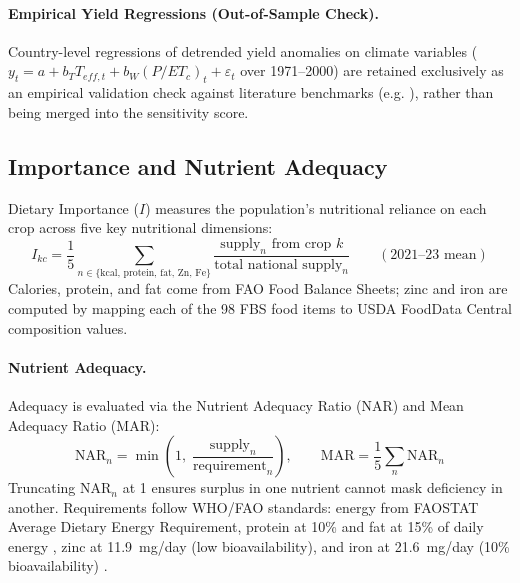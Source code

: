 \documentclass[11pt,a4paper]{article}
\let\parencite\citep
\newcommand{\TT}{\mathrm{T}}   %
\begin{document}
\begin{table}[H]\centering\small

\caption{Literature parameters used for Exposure and Sensitivity. $T_{crit}, T_{lim}$: critical and limit temperatures; $s^{\TT}$: heat loss slope; $K_y$: FAO water yield factor; $K_c$: crop coefficients.}\label{tab:params}
\end{table}

\paragraph{Empirical Yield Regressions (Out-of-Sample Check).} Country-level regressions of detrended yield anomalies on climate variables ($y_t = a + b_T T_{eff,t} + b_W (P/ET_c)_t + \varepsilon_t$ over 1971--2000) are retained exclusively as an empirical validation check against literature benchmarks (e.g. \citealt{zhao2017}), rather than being merged into the sensitivity score.

\subsection{Importance and Nutrient Adequacy}
Dietary Importance ($I$) measures the population's nutritional reliance on each crop across five key nutritional dimensions:
\begin{equation}
I_{kc} = \frac{1}{5} \sum_{n \in \{\mathrm{kcal,\,protein,\,fat,\,Zn,\,Fe}\}} \frac{\text{supply}_n\text{ from crop }k}{\text{total national supply}_n}\qquad (2021\text{--}23\text{ mean})
\end{equation}
Calories, protein, and fat come from FAO Food Balance Sheets; zinc and iron are computed by mapping each of the 98 FBS food items to USDA FoodData Central composition values.

\paragraph{Nutrient Adequacy.} Adequacy is evaluated via the Nutrient Adequacy Ratio (NAR) and Mean Adequacy Ratio (MAR):
\begin{equation}
\mathrm{NAR}_n = \min\left(1,\; \frac{\text{supply}_n}{\text{requirement}_n}\right),\qquad \mathrm{MAR} = \frac{1}{5}\sum_{n} \mathrm{NAR}_n
\end{equation}
Truncating $\mathrm{NAR}_n$ at 1 ensures surplus in one nutrient cannot mask deficiency in another. Requirements follow WHO/FAO standards: energy from FAOSTAT Average Dietary Energy Requirement, protein at 10\% and fat at 15\% of daily energy \parencite{who2003}, zinc at \SI{11.9}{mg/day} (low bioavailability), and iron at \SI{21.6}{mg/day} (10\% bioavailability) \parencite{whofao2004}.
\end{document}
